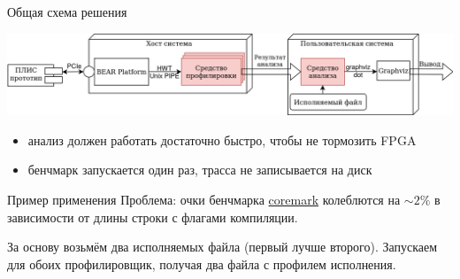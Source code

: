 \documentclass[10pt,aspectratio=169,hyperref={pdftex,unicode},xcolor=dvipsnames]{beamer}
\begin{document}
\begin{frame}{ Общая схема решения }
    \begin{center}
        \includegraphics[width=\textwidth,keepaspectratio]{./images/stac_arch.png}
    \end{center}
    \begin{itemize}
        \pause \item анализ должен работать достаточно быстро, чтобы не тормозить FPGA
        \pause \item бенчмарк запускается один раз, трасса не записывается на диск
    \end{itemize}
\end{frame}

\begin{frame}{ Пример применения }
    Проблема: очки бенчмарка \href{https://github.com/eembc/coremark}{coremark}
    колеблются на $\sim2\%$ в зависимости от длины строки с флагами компиляции.

    За основу возьмём два исполняемых файла (первый лучше второго).
    Запускаем для обоих профилировщик, получая два файла с профилем исполнения.
\end{frame}
\end{document}
